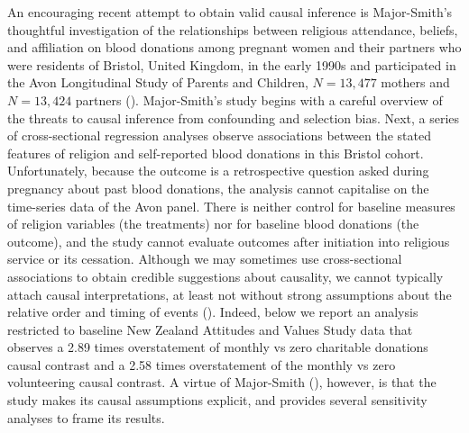\documentclass[
  single column]{article}
\begin{document}
An encouraging recent attempt to obtain valid causal inference is
Major-Smith's thoughtful investigation of the relationships between
religious attendance, beliefs, and affiliation on blood donations among
pregnant women and their partners who were residents of Bristol, United
Kingdom, in the early 1990s and participated in the Avon Longitudinal
Study of Parents and Children, \(N=13,477\) mothers and \(N=13,424\)
partners ().
Major-Smith's study begins with a careful overview of the threats to
causal inference from confounding and selection bias. Next, a series of
cross-sectional regression analyses observe associations between the
stated features of religion and self-reported blood donations in this
Bristol cohort. Unfortunately, because the outcome is a retrospective
question asked during pregnancy about past blood donations, the analysis
cannot capitalise on the time-series data of the Avon panel. There is
neither control for baseline measures of religion variables (the
treatments) nor for baseline blood donations (the outcome), and the
study cannot evaluate outcomes after initiation into religious service
or its cessation. Although we may sometimes use cross-sectional
associations to obtain credible suggestions about causality, we cannot
typically attach causal interpretations, at least not without strong
assumptions about the relative order and timing of events
(). Indeed, below we
report an analysis restricted to baseline New Zealand Attitudes and
Values Study data that observes a 2.89 times overstatement of monthly vs
zero charitable donations causal contrast and a 2.58 times overstatement
of the monthly vs zero volunteering causal contrast. A virtue of
Major-Smith (), however, is that
the study makes its causal assumptions explicit, and provides several
sensitivity analyses to frame its results.
\end{document}
